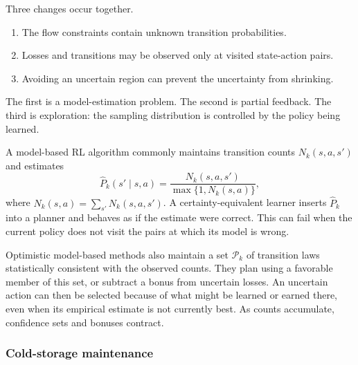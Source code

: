 Three changes occur together.
\begin{enumerate}
\item The flow constraints contain unknown transition probabilities.
\item Losses and transitions may be observed only at visited state-action pairs.
\item Avoiding an uncertain region can prevent the uncertainty from shrinking.
\end{enumerate}
The first is a model-estimation problem. The second is partial feedback. The third is exploration: the sampling distribution is controlled by the policy being learned.

A model-based RL algorithm commonly maintains transition counts $N_k(s,a,s')$ and estimates
\begin{equation}
\widehat P_k(s'\mid s,a)
=
\frac{N_k(s,a,s')}
{\max\{1,N_k(s,a)\}},
\label{eq:online_empirical_transition}
\end{equation}
where $N_k(s,a)=\sum_{s'}N_k(s,a,s')$. A certainty-equivalent learner inserts $\widehat P_k$ into a planner and behaves as if the estimate were correct. This can fail when the current policy does not visit the pairs at which its model is wrong.

Optimistic model-based methods also maintain a set $\mathcal P_k$ of transition laws statistically consistent with the observed counts. They plan using a favorable member of this set, or subtract a bonus from uncertain losses. An uncertain action can then be selected because of what might be learned or earned there, even when its empirical estimate is not currently best. As counts accumulate, confidence sets and bonuses contract.

\subsubsection{Cold-storage maintenance}
\label{sec:online_cold_storage}

